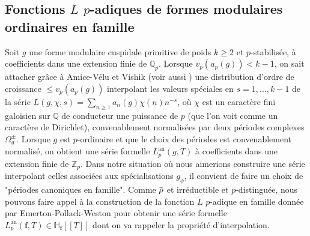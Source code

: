 \documentclass[12pt]{amsart}
\newcommand\bQ{\mathbb{Q}}
\newcommand\bH{\mathbb{H}}
\newcommand\Zp{{\mathbb{Z}_{p}}}
\newcommand\Qp{\mathbb{Q}_{p}}
\newcommand{\ob}[1]{\mkern 1.5mu\overline{\mkern-1.5mu#1\mkern-1.5mu}\mkern 1.5mu}
\newcommand{\an}{\textrm{an}}
\theoremstyle{defstyle}
\theoremstyle{thmstyle}
\begin{document}
\subsection{Fonctions $L$ $p$-adiques de formes modulaires ordinaires en famille}\label{sec:Lpfamille}
Soit $g$ une forme modulaire cuspidale primitive de poids $k\geq 2$ et $p$-stabilisée, à coefficients dans une extension finie de $\Qp$. Lorsque $v_p(a_p(g))<k-1$, on sait attacher grâce à Amice-Vélu \cite{amice1975distributions} et Vishik \cite{vishik1976non} (voir aussi \cite{mtt}) une distribution d'ordre de croissance $\leq v_p(a_p(g))$ interpolant les valeurs spéciales en $s=1,\ldots,k-1$ de la série $L(g, \chi,s)=\sum_{n\geq 1} a_n(g)\chi(n)n^{-s}$, où $\chi$ est un caractère fini galoisien sur $\bQ$ de conducteur une puissance de $p$ (que l'on voit comme un caractère de Dirichlet), convenablement normalisées par deux périodes complexes $\Omega_g^\pm$. Lorsque $g$ est $p$-ordinaire et que le choix des périodes est convenablement normalisé, on obtient une série formelle $L^\an_p(g,T)$ à coefficients dans une extension finie de $\Zp$. Dans notre situation où nous aimerions construire une série interpolant celles associées aux spécialisations $g_\phi$, il convient de faire un choix de "périodes canoniques en famille". Comme $\ob{\rho}$ et irréductible et $p$-distinguée, nous pouvons faire appel à la construction de la fonction $L$ $p$-adique en famille donnée par Emerton-Pollack-Weston \cite{emerton2006variation} pour obtenir une série formelle $L^\an_p(\textbf{f},T)\in \bH_\textbf{f}[[T]]$ dont on va rappeler la propriété d'interpolation.
\end{document}
